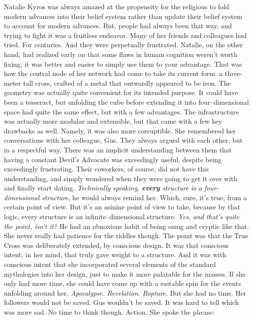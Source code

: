 Natalie Kyros was always amazed at the propensity for the religious to fold modern advances into their belief system rather than update their belief system to account for modern advances. But, people had always been that way, and trying to fight it was a fruitless endeavor. Many of her friends and colleagues had tried. For centuries. And they were perpetually frustrated.
\SmallVSpace
Natalie, on the other hand, had realized early on that some flaws in human cognition weren’t worth fixing; it was better and easier to simply use them to your advantage. That was how the central node of her network had come to take its current form: a three-meter tall cross, crafted of a metal that outwardly appeared to be iron.
\SmallVSpace
\SmallVSpace
The geometry was actually quite convenient for its intended purpose. It could have been a tesseract, but unfolding the cube before extending it into four\mbox{--}dimensional space had quite the same effect, but with a few advantages. The infrastructure was actually more modular and extensible, but that came with a few key drawbacks as well. Namely, it was also more corruptible.
\SmallVSpace
She remembered her conversations with her colleague, Gus. They always argued with each other, but in a respectful way. There was an implicit understanding between them that having a constant Devil’s Advocate was exceedingly useful, despite being exceedingly frustrating. Their coworkers, of course, did not have this understanding, and simply wondered when they were going to get it over with and finally start dating.
\SmallVSpace
\emph{Technically speaking, \textbf{every} structure is a four-dimensional structure}, he would always remind her. Which, sure, it’s true, from a certain point of view. But it’s an asinine point of view to take, because by that logic, every structure is an infinite\mbox{--}dimensional structure. \emph{Yes, and that’s quite the point, isn’t it?}
\SmallVSpace
He had an obnoxious habit of being smug and cryptic like that. She never really had patience for the riddles though. The point was that the True Cross was deliberately extended, by conscious design. It was that conscious intent, in her mind, that truly gave weight to a structure.
\SmallVSpace
And it was with conscious intent that she incorporated several elements of the standard mythologies into her design, just to make it more palatable for the masses. If she only had more time, she could have come up with a suitable spin for the events unfolding around her. \emph{Apocalypse. Revelation. Rapture.}
\SmallVSpace
But she had no time. Her followers would not be saved. Gus wouldn’t be saved. It was hard to tell which was more sad. No time to think though. Action. She spoke the phrase:
